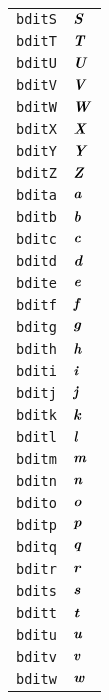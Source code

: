 \begin{longtable}{ll}
\texttt{bditS}&${}{\textbf{\textit{S}}}{}$\\
\texttt{bditT}&${}{\textbf{\textit{T}}}{}$\\
\texttt{bditU}&${}{\textbf{\textit{U}}}{}$\\
\texttt{bditV}&${}{\textbf{\textit{V}}}{}$\\
\texttt{bditW}&${}{\textbf{\textit{W}}}{}$\\
\texttt{bditX}&${}{\textbf{\textit{X}}}{}$\\
\texttt{bditY}&${}{\textbf{\textit{Y}}}{}$\\
\texttt{bditZ}&${}{\textbf{\textit{Z}}}{}$\\
\texttt{bdita}&${}{\textbf{\textit{a}}}{}$\\
\texttt{bditb}&${}{\textbf{\textit{b}}}{}$\\
\texttt{bditc}&${}{\textbf{\textit{c}}}{}$\\
\texttt{bditd}&${}{\textbf{\textit{d}}}{}$\\
\texttt{bdite}&${}{\textbf{\textit{e}}}{}$\\
\texttt{bditf}&${}{\textbf{\textit{f}}}{}$\\
\texttt{bditg}&${}{\textbf{\textit{g}}}{}$\\
\texttt{bdith}&${}{\textbf{\textit{h}}}{}$\\
\texttt{bditi}&${}{\textbf{\textit{i}}}{}$\\
\texttt{bditj}&${}{\textbf{\textit{j}}}{}$\\
\texttt{bditk}&${}{\textbf{\textit{k}}}{}$\\
\texttt{bditl}&${}{\textbf{\textit{l}}}{}$\\
\texttt{bditm}&${}{\textbf{\textit{m}}}{}$\\
\texttt{bditn}&${}{\textbf{\textit{n}}}{}$\\
\texttt{bdito}&${}{\textbf{\textit{o}}}{}$\\
\texttt{bditp}&${}{\textbf{\textit{p}}}{}$\\
\texttt{bditq}&${}{\textbf{\textit{q}}}{}$\\
\texttt{bditr}&${}{\textbf{\textit{r}}}{}$\\
\texttt{bdits}&${}{\textbf{\textit{s}}}{}$\\
\texttt{bditt}&${}{\textbf{\textit{t}}}{}$\\
\texttt{bditu}&${}{\textbf{\textit{u}}}{}$\\
\texttt{bditv}&${}{\textbf{\textit{v}}}{}$\\
\texttt{bditw}&${}{\textbf{\textit{w}}}{}$\\

\end{longtable}
